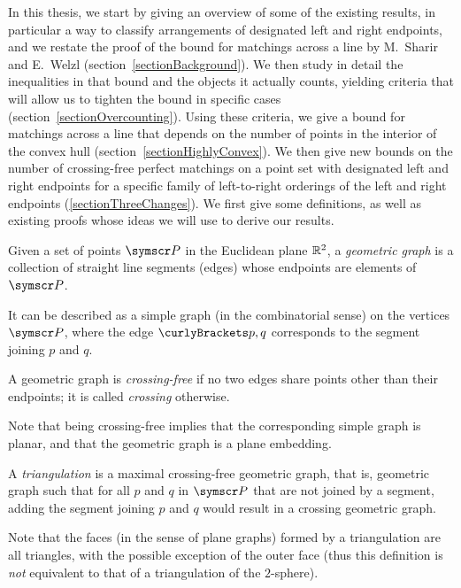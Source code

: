 In this thesis, 
we start by giving an overview of some of the existing results, in particular a way
to classify arrangements of designated left and right endpoints,
and we restate the proof of the bound for matchings across a line by M.~Sharir and E.~Welzl
(section~\ref{sectionBackground}).
We then study in detail the inequalities in that bound and the objects it actually counts,
yielding criteria that will allow us to tighten the bound in specific cases (section~\ref{sectionOvercounting}).
Using these criteria, we give a bound for
matchings across a line that depends on the number of points in the interior of the convex hull
(section~\ref{sectionHighlyConvex}).
We then give new bounds on the number of crossing-free perfect matchings on a point set with designated left and
right endpoints for a specific family of left-to-right orderings of the left and right endpoints
(\ref{sectionThreeChanges}). 
\label{sectionBackground}
We first give some definitions, as well as existing proofs whose ideas we will use to derive our results.
\begin{definition}
Given a set of points $\pointset P$ in the Euclidean plane $\mathbb{R}^2$,
a \emph{geometric graph} is a collection of straight line segments (edges)
whose endpoints are elements of $\pointset P$.

It can be described as a simple graph (in the combinatorial sense)
on the vertices $\pointset P$, where the edge $\set{p,q}$ corresponds to the segment joining
$p$ and $q$.
\end{definition}
\begin{definition}
A geometric graph is \emph{crossing-free} if no two edges share points other than
their endpoints; it is called \emph{crossing} otherwise.
\end{definition}
Note that being crossing-free implies that the corresponding simple graph is planar, and that the
geometric graph is a plane embedding.
\begin{sloppypar}
\begin{definition}[triangulation]
A \emph{triangulation} is a maximal crossing-free geometric graph, that is,
geometric graph such that for all $p$ and $q$ in $\pointset P$ that are not joined by a
segment, adding the segment joining $p$ and $q$ would result in a crossing
geometric graph.
\end{definition}
Note that the faces (in the sense of plane graphs) formed by a triangulation are
all triangles, with the possible exception of the outer face (thus this definition
is \emph{not} equivalent to that of a triangulation of the $2$-sphere).
\end{sloppypar}

